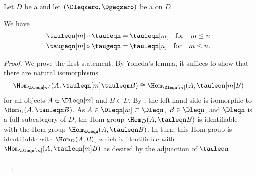 \begin{lemma} \label{lemma:composition_of_truncation_functors_for_t_structures_on_triangulated_categories}
        Let $D$ be a  and let $(\Dleqzero, \Dgeqzero)$ be a  on $D$.

    We have 
    \begin{align*}
    \tauleqn[m] \circ \tauleqn &= \tauleqn[m] \quad \text{for} \quad m \leq n \\
    \taugeqn[m] \circ \taugeqn &= \tauleqn[n] \quad \text{for} \quad m \leq n.
    \end{align*}
\end{lemma}

\begin{proof}
    We prove the first statement. By Yoneda's lemma, it suffices to show that there are natural isomorphisms
    \begin{align*}
    \Hom_{\Dleqn[m]}(A, \tauleqn[m] \tauleqn B) \cong \Hom_{\Dleqn[m]}(A, \tauleqn[m] B)
    \end{align*}
    for all objects $A \in \Dleqn[m]$ and $B \in D$. By , the left hand side is isomorphic to $\Hom_{D}(A, \tauleqn B)$. As $A \in \Dleqn[m] \subset \Dleqn$, $B \in \Dleqn$, and $\Dleqn$ is a full subcategory of $D$, the Hom-group $\Hom_{D}(A, \tauleqn B)$ is identifiable with the Hom-group $\Hom_{\Dleqn}(A, \tauleqn B)$. In turn, this Hom-group is identifiable with $\Hom_{D}(A, B)$, which is identifiable with $\Hom_{\Dleqn[m]}(A, \tauleqn[m] B)$ as desired by the adjunction of $\tauleqn$. 
    
    \begin{align*}
    \end{align*}
\end{proof}